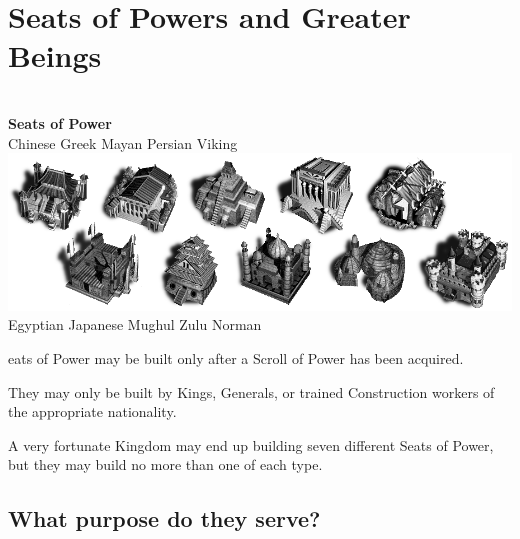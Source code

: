 
\chapter{Seats of Powers and Greater Beings}


\begin{center}
	\\ \textbf{Seats of Power}
	\\ Chinese Greek Mayan Persian Viking
	\includegraphics[width=0.7\linewidth]{Iseats}
	\\ Egyptian Japanese Mughul Zulu Norman
\end{center}

eats of Power may be built only after a Scroll of Power has been acquired.

They may only be built by Kings, Generals, or trained Construction workers of the appropriate nationality.

A very fortunate Kingdom may end up building seven different Seats of Power, but they may build no more than one of each type.

\clearpage

\section{What purpose do they serve?}

